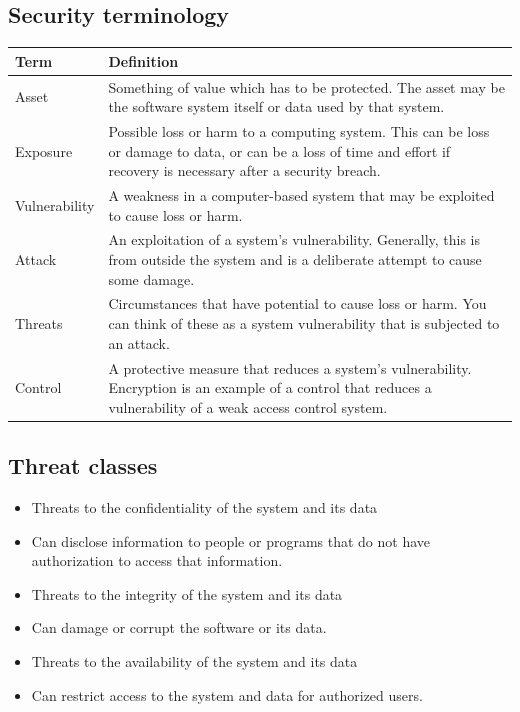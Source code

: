 \subsection{Security terminology}
\begin{table}[h!]
\centering
\begin{tabular}{ |p{3cm}|p{8cm}|  }
\hline
Term & Definition \\
\hline
\hline
Asset & Something of value which has to be protected. The asset may be the software system itself or data used by that system.\\
\hline
Exposure & Possible loss or harm to a computing system. This can be loss or damage to data, or can be a loss of time and effort if recovery is necessary after a security breach.\\
\hline
Vulnerability & A weakness in a computer-based system that may be exploited to cause loss or harm.\\
\hline
Attack & An exploitation of a system’s vulnerability. Generally, this is from outside the system and is a deliberate attempt to cause some damage.\\
\hline
Threats & Circumstances that have potential to cause loss or harm. You can think of these as a system vulnerability that is subjected to an attack.\\
\hline
Control & A protective measure that reduces a system’s vulnerability. Encryption is an example of a control that reduces a vulnerability of a weak access control system.\\
\hline
\end{tabular}

\label{table:T4_2}
\end{table}

\subsection{Threat classes}
\begin{itemize}
\item Threats to the confidentiality of the system and its data

  \item Can disclose information to people or programs that do not have authorization to access that information.

\item Threats to the integrity of the system and its data   \item Can damage or corrupt the software or its data.
\item Threats to the availability of the system and its data   \item Can restrict access to the system and data for authorized users.

\end{itemize}


